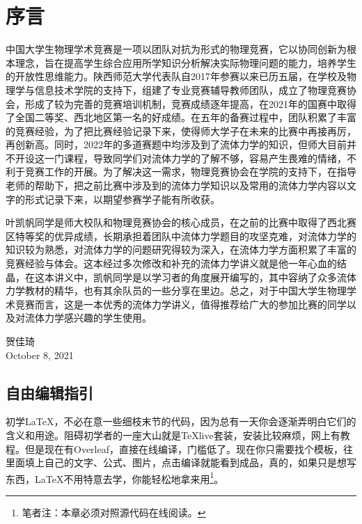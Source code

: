 \documentclass[cn,11pt,newtx,citestyle=gb7714-2015,bibstyle=gb7714-2015]{elegantbook}
\begin{document}
\chapter{序言}
中国大学生物理学术竞赛是一项以团队对抗为形式的物理竞赛，它以协同创新为根本理念，旨在提高学生综合应用所学知识分析解决实际物理问题的能力，培养学生的开放性思维能力。陕西师范大学代表队自2017年参赛以来已历五届，在学校及物理学与信息技术学院的支持下，组建了专业竞赛辅导教师团队，成立了物理竞赛协会，形成了较为完善的竞赛培训机制，竞赛成绩逐年提高，在2021年的国赛中取得了全国二等奖、西北地区第一名的好成绩。在五年的备赛过程中，团队积累了丰富的竞赛经验，为了把比赛经验记录下来，使得师大学子在未来的比赛中再接再厉，再创新高。同时，2022年的多道赛题中均涉及到了流体力学的知识，但师大目前并不开设这一门课程，导致同学们对流体力学的了解不够，容易产生畏难的情绪，不利于竞赛工作的开展。为了解决这一需求，物理竞赛协会在学院的支持下，在指导老师的帮助下，把之前比赛中涉及到的流体力学知识以及常用的流体力学内容以文字的形式记录下来，以期望参赛学子能有所收获。

叶凯帆同学是师大校队和物理竞赛协会的核心成员，在之前的比赛中取得了西北赛区特等奖的优异成绩，长期承担着团队中流体力学题目的攻坚克难，对流体力学的知识较为熟悉，对流体力学的问题研究得较为深入，在流体力学方面积累了丰富的竞赛经验与体会。这本经过多次修改和补充的流体力学讲义就是他一年心血的结晶，在这本讲义中，凯帆同学是以学习者的角度展开编写的，其中容纳了众多流体力学教材的精华，也有其余队员的一些分享在里边。总之，对于中国大学生物理学术竞赛而言，这是一本优秀的流体力学讲义，值得推荐给广大的参加比赛的同学以及对流体力学感兴趣的学生使用。
\begin{flushright}
贺佳琦\\
October 8, 2021
\end{flushright}

\tableofcontents
\mainmatter

	\section{自由编辑指引}
	初学\LaTeX ，不必在意一些细枝末节的代码，因为总有一天你会逐渐弄明白它们的含义和用途。阻碍初学者的一座大山就是TeXlive套装，安装比较麻烦，网上有教程。但是现在有Overleaf，直接在线编译，门槛低了。现在你只需要找个模板，往里面填上自己的文字、公式、图片，点击编译就能看到成品，真的，如果只是想写东西，\LaTeX 不用特意去学，你能轻松地拿来用\footnote{笔者注：本章必须对照源代码在线阅读。}。
	
\end{document}
